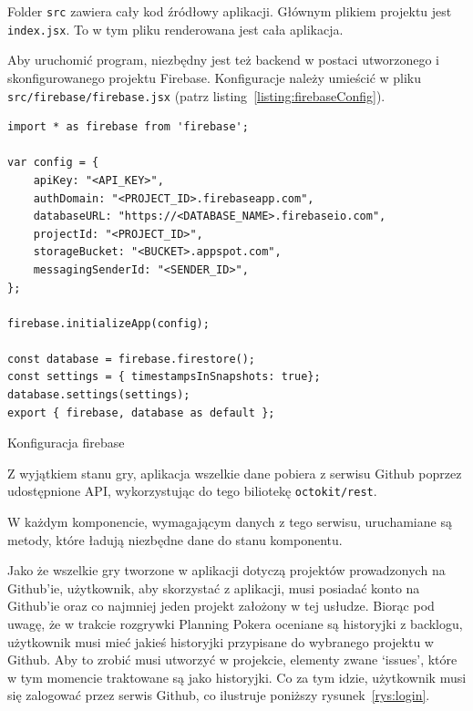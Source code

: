 Folder \texttt{src} zawiera cały kod źródłowy aplikacji.
Głównym plikiem projektu jest \texttt{index.jsx}. To w tym pliku renderowana jest cała aplikacja.

Aby uruchomić program, niezbędny jest też backend w postaci utworzonego
i skonfigurowanego projektu Firebase.
Konfiguracje należy umieścić w pliku \texttt{src/firebase/firebase.jsx}
(patrz listing~\ref{listing:firebaseConfig}).

\begin{listing}
\begin{verbatim}
import * as firebase from 'firebase';

var config = {
    apiKey: "<API_KEY>",
    authDomain: "<PROJECT_ID>.firebaseapp.com",
    databaseURL: "https://<DATABASE_NAME>.firebaseio.com",
    projectId: "<PROJECT_ID>",
    storageBucket: "<BUCKET>.appspot.com",
    messagingSenderId: "<SENDER_ID>",
};

firebase.initializeApp(config);

const database = firebase.firestore();
const settings = { timestampsInSnapshots: true};
database.settings(settings);
export { firebase, database as default };
\end{verbatim}
\caption{Konfiguracja firebase}\label{listing:firebaseConfig}
\end{listing}

Z wyjątkiem stanu gry, aplikacja wszelkie dane pobiera z serwisu Github poprzez
udostępnione API, wykorzystując do tego biliotekę \texttt{octokit/rest}.

W każdym komponencie, wymagającym danych z tego serwisu,
uruchamiane są metody, które ładują niezbędne dane do stanu komponentu.

Jako że wszelkie gry tworzone w aplikacji dotyczą projektów prowadzonych na Github'ie,
użytkownik, aby skorzystać z aplikacji, musi posiadać konto na Github'ie oraz co najmniej
jeden projekt założony w tej usłudze.
Biorąc pod uwagę, że w trakcie rozgrywki Planning Pokera oceniane są historyjki z backlogu,
użytkownik musi mieć jakieś historyjki przypisane do wybranego projektu w Github.
Aby to zrobić musi utworzyć w projekcie, elementy zwane `issues', które w tym momencie traktowane są jako historyjki.
Co za tym idzie, użytkownik musi się zalogować przez serwis Github, co ilustruje poniższy rysunek~\ref{rys:login}.

